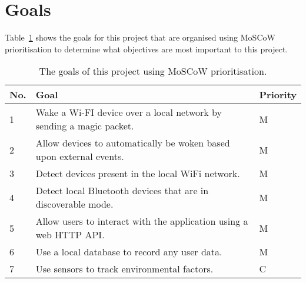 
\section{Goals}

Table~\ref{tab:goals} shows the goals for this project that are organised using MoSCoW prioritisation to determine what objectives are most important to this project.

\begin{table}[ht]
    \centering
    \begin{tabular}{ | l | p{} | l | }
        \hline
         \textbf{No.}
         & \textbf{Goal}
         & \textbf{Priority}
         \\\hline
         1 
         & Wake a Wi-FI device over a local network by sending a magic packet.
         & M
         \\\hline
         2
         & Allow devices to automatically be woken based upon external events.
         & M
         \\\hline
         3
         & Detect devices present in the local WiFi network.
         & M
         \\\hline
         4
         & Detect local Bluetooth devices that are in discoverable mode.
         & M
         \\\hline
         5
         & Allow users to interact with the application using a web HTTP API.
         & M
         \\\hline
         6
         & Use a local database to record any user data.
         & M
         \\\hline
         7
         & Use sensors to track environmental factors. 
         & C
         \\\hline
    \end{tabular}
    \vspace{2mm}
    \caption{The goals of this project using MoSCoW prioritisation.}
    \label{tab:goals}
\end{table}